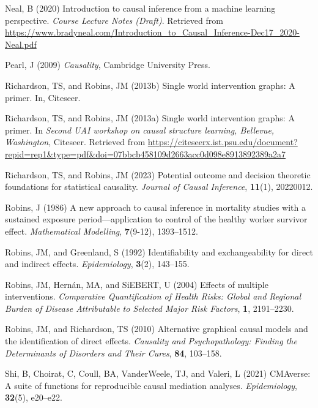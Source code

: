 \documentclass[
  single column]{article}
\newlength{\cslhangindent}
\newenvironment{CSLReferences}[2] %
 {\begin{list}{}{%
  \setlength{\itemindent}{0pt}
  \setlength{\leftmargin}{0pt}
  \setlength{\parsep}{0pt}
  \ifodd #1
   \setlength{\leftmargin}{\cslhangindent}
   \setlength{\itemindent}{-1\cslhangindent}
  \fi
  \setlength{\itemsep}{#2\baselineskip}}}
 {\end{list}}
\begin{document}
\begin{CSLReferences}{1}{0}
Neal, B (2020) Introduction to causal inference from a machine learning
perspective. \emph{Course Lecture Notes (Draft)}. Retrieved from
\url{https://www.bradyneal.com/Introduction_to_Causal_Inference-Dec17_2020-Neal.pdf}

Pearl, J (2009) \emph{Causality}, Cambridge University Press.

Richardson, TS, and Robins, JM (2013b) Single world intervention graphs:
A primer. In, Citeseer.

Richardson, TS, and Robins, JM (2013a) Single world intervention graphs:
A primer. In \emph{Second UAI workshop on causal structure learning,
{B}ellevue, {W}ashington}, Citeseer. Retrieved from
\url{https://citeseerx.ist.psu.edu/document?repid=rep1&type=pdf&doi=07bbcb458109d2663acc0d098e8913892389a2a7}

Richardson, TS, and Robins, JM (2023) Potential outcome and decision
theoretic foundations for statistical causality. \emph{Journal of Causal
Inference}, \textbf{11}(1), 20220012.

Robins, J (1986) A new approach to causal inference in mortality studies
with a sustained exposure period---application to control of the healthy
worker survivor effect. \emph{Mathematical Modelling}, \textbf{7}(9-12),
1393--1512.

Robins, JM, and Greenland, S (1992) Identifiability and exchangeability
for direct and indirect effects. \emph{Epidemiology}, \textbf{3}(2),
143--155.

Robins, JM, Hernán, MA, and SiEBERT, U (2004) Effects of multiple
interventions. \emph{Comparative Quantification of Health Risks: Global
and Regional Burden of Disease Attributable to Selected Major Risk
Factors}, \textbf{1}, 2191--2230.

Robins, JM, and Richardson, TS (2010) Alternative graphical causal
models and the identification of direct effects. \emph{Causality and
Psychopathology: Finding the Determinants of Disorders and Their Cures},
\textbf{84}, 103--158.

Shi, B, Choirat, C, Coull, BA, VanderWeele, TJ, and Valeri, L (2021)
CMAverse: A suite of functions for reproducible causal mediation
analyses. \emph{Epidemiology}, \textbf{32}(5), e20--e22.


\end{CSLReferences}
\end{document}

